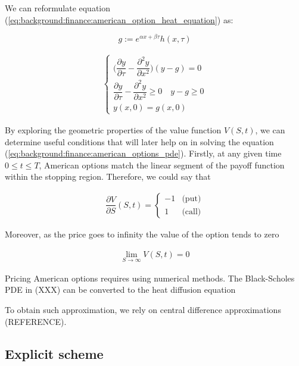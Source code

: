 We can reformulate equation (\ref*{eq:background:finance:american_option_heat_equation})
as:

\begin{equation}
  g := e^{\alpha x + \beta \tau}h(x, \tau)
\end{equation}

\begin{align}
  \begin{cases}
    \big(\dfrac{\partial y}{\partial \tau} - \dfrac{\partial^2 y}{\partial x^2}\big)(y  - g) =0 \\
    \dfrac{\partial y}{\partial \tau} - \dfrac{\partial^2 y}{\partial x^2} \ge 0 \quad y - g \ge 0 \\
    y(x, 0) = g(x, 0)
  \end{cases}
\end{align}


By exploring the geometric properties of the value function $V(S,t)$, 
we can determine useful conditions that will later help on in solving the equation 
(\ref*{eq:background:finance:american_options_pde}). Firstly, at
any given time $0 \le t \le T$, American options match the linear segment of the payoff
function within the stopping region. Therefore, we could say that 

\begin{align}
  \dfrac{\partial V}{\partial S}(S, t) =  \begin{cases}
    -1 & \text{(put)} \\ 
    1 & \text{(call)}
  \end{cases}
  \label{eq:background:finance:american_option_left_boundary}
\end{align}

Moreover, as the price goes to infinity the value of the option tends to zero

\begin{align}
  \lim_{S \rightarrow \infty}V(S, t) = 0 
  \label{eq:background:finance:american_option_stopping_right_boundary}
\end{align}



Pricing American options requires using numerical methods. The Black-Scholes PDE 
in (XXX) can be converted to the heat diffusion equation



To obtain such approximation, we rely on central difference approximations (REFERENCE).



\subsection{Explicit scheme}

